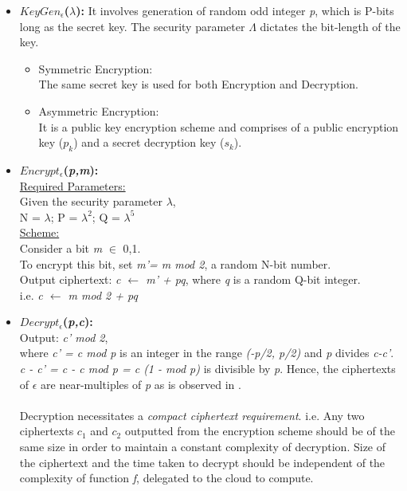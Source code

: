 \begin{itemize}
\item \textbf{\textit{$KeyGen_\epsilon$}($\lambda$):}
It involves generation of random odd integer \textit{p}, which is P-bits long as the secret key. The security parameter $\Lambda$ dictates the bit-length of the key.
\begin{itemize}
\item Symmetric Encryption: \\
The same secret key is used for both Encryption and Decryption.  
\item Asymmetric Encryption:\\ It is a public key encryption scheme and comprises of a public encryption key ($p_k$) and a secret decryption key ($s_k$).
\end{itemize}
\item \textbf{\textit{$Encrypt_\epsilon$}(\textit{p,m}):}\\
\underline{Required Parameters:}\\
Given the security parameter $\lambda$, \\N = $\lambda$; P = $\lambda^2$; Q = $\lambda^5$\\
\underline{Scheme:}\\
Consider a bit \textit{m} $\in$ {0,1}. \\To encrypt this bit, set \textit{m'= m mod 2}, a random N-bit number.\\
Output ciphertext: \textit{c $\leftarrow$ m' + pq}, where \textit{q} is a random Q-bit integer.\\
i.e. \textit{c $\leftarrow$ m mod 2 + pq}
\item \textbf{\textit{$Decrypt_\epsilon$}(\textit{p,c}):}\\
Output: \textit{c' mod 2}, \\where \textit{c' = c mod p} is an integer in the range \textit{(-p/2, p/2)} and \textit{p} divides \textit{c-c'}.\\
\textit{c - c' = c - c mod p = c (1 - mod p)} is divisible by \textit{p}. Hence, the ciphertexts of $\epsilon$ are near-multiples of \textit{p} as is observed in \cite{gentry2010computing}.\\ \\Decryption necessitates a \textit{compact ciphertext requirement}. i.e. Any two ciphertexts $c_1$ and $c_2$ outputted from the encryption scheme should be of the same size in order to maintain a constant complexity of decryption\cite{gentry2010computing}. Size of the ciphertext and the time taken to decrypt should be independent of the complexity of function \textit{f}, delegated to the cloud to compute.

\end{itemize}
